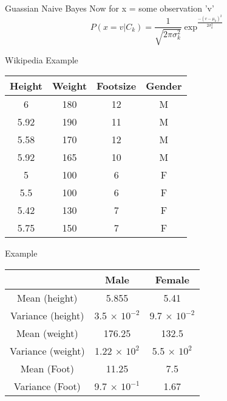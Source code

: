 \documentclass{beamer}
\begin{document}
\begin{frame}{Guassian Naive Bayes}
    Now for x = some observation 'v'\\
    \begin{equation*}
        P(x=v\vert C_{k}) = \frac{1}{\sqrt{2\pi \sigma_{k}^{2}}} \exp^{\frac{-(v-\mu_{k})^{2}}{2\sigma_{k}^{2}}}
    \end{equation*}
\end{frame}

\begin{frame}{Wikipedia Example}

    \begin{center}
    \begin{tabular}{|c|c|c|c|}
    \hline
    Height&Weight&Footsize&Gender\\
    \hline
    \hline
         6 & 180& 12& M \\
         5.92 & 190& 11& M \\
         5.58 & 170& 12& M \\
         5.92 & 165& 10& M \\
         5 & 100& 6& F \\
         5.5 & 100& 6& F \\
         5.42 & 130& 7& F \\
         5.75 & 150& 7& F \\
         \hline
    \end{tabular}
    
    \end{center}
    
\end{frame}

\begin{frame}{Example}
    \begin{center}
        
    
    \begin{tabular}{|c|c|c|}
    \hline
     &Male&Female\\
     \hline
     \hline
     Mean (height) & 5.855 & 5.41  \\
     Variance (height) & 3.5 $\times$ $10^{-2}$ & 9.7 $\times$ $10^{-2}$  \\
     Mean (weight) & 176.25 & 132.5  \\
     Variance (weight) & 1.22 $\times$ $10^{2}$ & 5.5 $\times$ $10^{2}$   \\
     Mean (Foot) & 11.25 & 7.5  \\
     Variance (Foot) & 9.7 $\times$ $10^{-1}$ & 1.67  \\
    \hline
    \hline
    \end{tabular}
    \end{center}
\end{frame}
\end{document}
